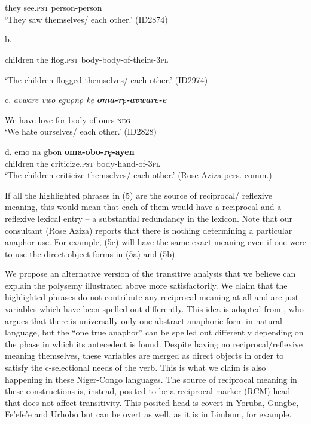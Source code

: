 \begin{listWWviiiNumxlileveli}
\item \ea\label{ex:}
\\
\ea\label{ex:}
\\
\end{listWWviiiNumxlileveli}
       they   see.\textsc{pst}   person-person \\
\glt   ‘They saw themselves/ each other.’ (ID2874)
\z

\glt b.  \textstylelsLanginfoChar{\textit{ }}
\z

\glt   children  the  flog.\textsc{pst}  body-body-of-theirs-\textsc{3pl}
\z

\glt   ‘The children flogged themselves/ each other.’ (ID2974)
\z

\glt c.  \textit{avware   vwo  eguọnọ   kẹ   }\textbf{\textit{oma-rẹ-avware-e}}\textit{ }  
\z

       We     have   love     for   body-of-ours-\textsc{neg}  \\
\glt   ‘We hate ourselves/ each other.’  (ID2828)
\z

\gll \textup{d.  }emo    na    gbon     \textbf{oma-obo-rẹ-ayen} \\
       children  the  criticize.\textsc{pst}   body-hand-of-\textsc{3pl}\\
\glt   ‘The children criticize themselves/ each other.’ (Rose Aziza pers. comm.)
\z

If all the highlighted phrases in (5) are the source of reciprocal/ reflexive meaning, this would mean that each of them would have a reciprocal and a reflexive lexical entry – a substantial redundancy in the lexicon. Note that our consultant (Rose Aziza) reports that there is nothing determining a particular anaphor use. For example, (5c) will have the same exact meaning even if one were to use the direct object forms in (5a) and (5b). 

  We propose an alternative version of the transitive analysis that we believe can explain the polysemy illustrated above more satisfactorily. We claim that the highlighted phrases do not contribute any reciprocal meaning at all and are just variables which have been spelled out differently. This idea is adopted from \citet{Safir2014}, who argues that there is universally only one abstract anaphoric form in natural language, but the “one true anaphor” can be spelled out differently depending on the phase in which its antecedent is found. Despite having no reciprocal/reflexive meaning themselves, these variables are merged as direct objects in order to satisfy the c-selectional needs of the verb. This is what we claim is also happening in these Niger-Congo languages. The source of reciprocal meaning in these constructions is, instead, posited to be a reciprocal marker (RCM) head that does not affect transitivity. This posited head is covert in Yoruba, Gungbe, Fe'efe'e and Urhobo but can be overt as well, as it is in Limbum, for example.

